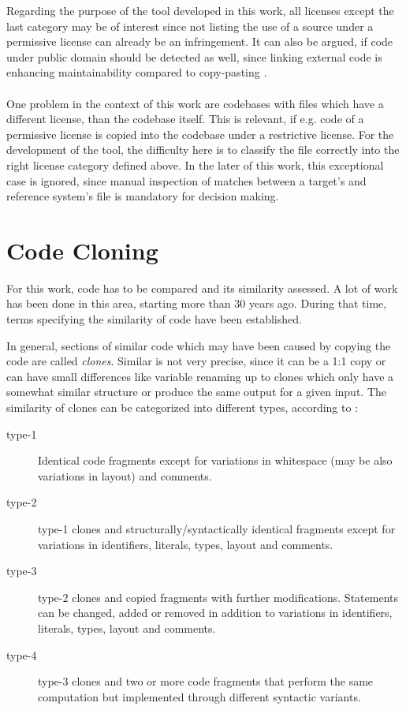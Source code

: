 Regarding the purpose of the tool developed in this work, all licenses except the last category may be of interest since not listing the use of a source under a permissive license can already be an infringement.
It can also be argued, if code under public domain should be detected as well, since linking external code is enhancing maintainability compared to copy-pasting \cite{heinemann2012effective}.
\\ \\
\noindent
One problem in the context of this work are codebases with files which have a different license, than the codebase itself.
This is relevant, if e.g. code of a permissive license is copied into the codebase under a restrictive license.
For the development of the tool, the difficulty here is to classify the file correctly into the right license category defined above.
In the later of this work, this exceptional case is ignored, since manual inspection of matches between a target's and reference system's file is mandatory for decision making.

\section{Code Cloning}\label{section:preliminaries/code_cloning}
For this work, code has to be compared and its similarity assessed.
A lot of work has been done in this area, starting more than 30 years ago\cite{lancaster2004comparison}.
During that time, terms specifying the similarity of code have been established.

In general, sections of similar code which may have been caused by copying the code are called \textit{clones}.
Similar is not very precise, since it can be a 1:1 copy or can have small differences like variable renaming up to clones which only have a somewhat similar structure or produce the same output for a given input.
The similarity of clones can be categorized into different types, according to \cite{roy2007survey}:

\begin{description}
	\item[type-1] Identical code fragments except for variations in whitespace (may be also variations in layout) and comments.
	\item[type-2] type-1 clones and structurally/syntactically identical fragments except for variations in identifiers, literals, types, layout and comments.
	\item[type-3] type-2 clones and copied fragments with further modifications. Statements can be changed, added or removed in addition to variations in identifiers, literals, types, layout and comments.
	\item[type-4] type-3 clones and two or more code fragments that perform the same computation but implemented through different syntactic variants.
\end{description}

